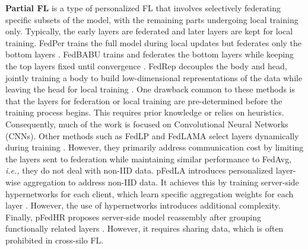 \textbf{Partial FL} is a type of personalized FL that involves selectively federating specific subsets of the model, with the remaining parts undergoing local training only. Typically, the early layers are federated and later layers are kept for local training. FedPer trains the full model during local updates but federates only the bottom layers \cite{arivazhagan2019federated}. FedBABU trains and federates the bottom layers while keeping the top layers fixed until convergence \cite{oh2021fedbabu}. FedRep decouples the body and head, jointly training a body to build low-dimensional representations of the data while leaving the head for local training \cite{collins2021exploiting}. One drawback common to these methods is that the layers for federation or local training are pre-determined before the training process begins. This requires prior knowledge or relies on heuristics. Consequently, much of the work is focused on Convolutional Neural Networks (CNNs). Other methods such as FedLP and FedLAMA select layers dynamically during training \cite{zhu2023fedlp, lee2023layer}. However, they primarily address communication cost by limiting the layers sent to federation while maintaining similar performance to FedAvg, \emph{i.e.,} they do not deal with non-IID data. pFedLA introduces personalized layer-wise aggregation to address non-IID data. It achieves this by training server-side hypernetworks for each client, which learn specific aggregation weights for each layer \cite{ma2022layer}. However, the use of hypernetworks introduces additional complexity. Finally, pFedHR proposes server-side model reassembly after grouping functionally related layers \cite{wang2024towards}. However, it requires sharing data, which is often prohibited in cross-silo FL.